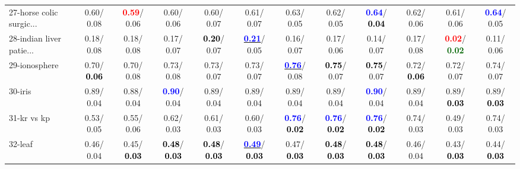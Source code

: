\begin{table}[h]
\begin{center}
{\begin{tabular}{lc|c|c|c|c|c|c|c|c|c|c}
27-horse colic surgic... &   0.60/  0.08 & \textcolor{red}{\textbf{  0.59}}/  0.06 &   0.60/  0.06 &   0.60/  0.07 &   0.61/  0.07 &   0.63/  0.05 &   0.62/  0.05 & \textcolor{blue}{\textbf{  0.64}}/\textcolor{black}{\textbf{  0.04}} &   0.62/  0.06 &   0.61/  0.06 & \textcolor{blue}{\textbf{  0.64}}/  0.05 \\
28-indian liver patie... &   0.18/  0.08 &   0.18/  0.08 &   0.17/  0.07 & \textcolor{black}{\textbf{  0.20}}/  0.07 & \underline{\textcolor{blue}{\textbf{  0.21}}}/  0.05 &   0.16/  0.07 &   0.17/  0.06 &   0.14/  0.07 &   0.17/  0.08 & \textcolor{red}{\textbf{  0.02}}/\textcolor{darkgreen}{\textbf{  0.02}} &   0.11/  0.06 \\ \hline
29-ionosphere &   0.70/\textcolor{black}{\textbf{  0.06}} &   0.70/  0.08 &   0.73/  0.08 &   0.73/  0.07 &   0.73/  0.07 & \underline{\textcolor{blue}{\textbf{  0.76}}}/  0.08 & \textcolor{black}{\textbf{  0.75}}/  0.07 & \textcolor{black}{\textbf{  0.75}}/  0.07 &   0.72/\textcolor{black}{\textbf{  0.06}} &   0.72/  0.07 &   0.74/  0.07 \\
30-iris &   0.89/  0.04 &   0.88/  0.04 & \textcolor{blue}{\textbf{  0.90}}/  0.04 &   0.89/  0.04 &   0.89/  0.04 &   0.89/  0.04 &   0.89/  0.04 & \textcolor{blue}{\textbf{  0.90}}/  0.04 &   0.89/  0.04 &   0.89/\textcolor{black}{\textbf{  0.03}} &   0.89/\textcolor{black}{\textbf{  0.03}} \\
31-kr vs kp &   0.53/  0.05 &   0.55/  0.06 &   0.62/  0.03 &   0.61/  0.03 &   0.60/  0.03 & \textcolor{blue}{\textbf{  0.76}}/\textcolor{black}{\textbf{  0.02}} & \textcolor{blue}{\textbf{  0.76}}/\textcolor{black}{\textbf{  0.02}} & \textcolor{blue}{\textbf{  0.76}}/\textcolor{black}{\textbf{  0.02}} &   0.74/  0.03 &   0.49/  0.03 &   0.74/  0.03 \\
32-leaf &   0.46/  0.04 &   0.45/\textcolor{black}{\textbf{  0.03}} & \textcolor{black}{\textbf{  0.48}}/\textcolor{black}{\textbf{  0.03}} & \textcolor{black}{\textbf{  0.48}}/\textcolor{black}{\textbf{  0.03}} & \underline{\textcolor{blue}{\textbf{  0.49}}}/\textcolor{black}{\textbf{  0.03}} &   0.47/\textcolor{black}{\textbf{  0.03}} & \textcolor{black}{\textbf{  0.48}}/\textcolor{black}{\textbf{  0.03}} & \textcolor{black}{\textbf{  0.48}}/\textcolor{black}{\textbf{  0.03}} &   0.46/  0.04 &   0.43/\textcolor{black}{\textbf{  0.03}} &   0.44/\textcolor{black}{\textbf{  0.03}} \\\end{tabular}
}\label{strats0aNB}
\end{center}
\end{table}

